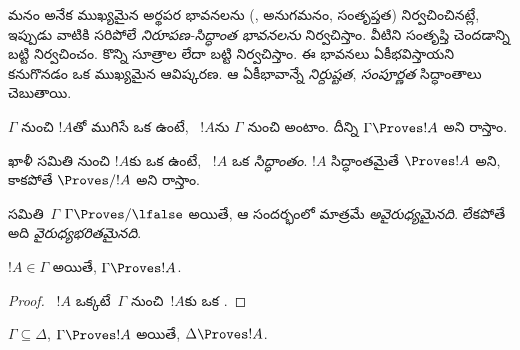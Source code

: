 \documentclass[../../../include/open-logic-section]{subfiles}
\begin{document}
      {}
      {}


\begin{explain}
మనం అనేక ముఖ్యమైన అర్థపర భావనలను
(, అనుగమనం, సంతృప్తత)
నిర్వచించినట్లే, ఇప్పుడు వాటికి సరిపోలే \emph{నిరూపణ-సిద్ధాంత
భావనలను} నిర్వచిస్తాం. వీటిని  
సంతృప్తి చెందడాన్ని బట్టి నిర్వచించం. కొన్ని సూత్రాల
 లేదా  బట్టి నిర్వచిస్తాం.
ఈ భావనలు ఏకీభవిస్తాయని కనుగొనడం ఒక ముఖ్యమైన ఆవిష్కరణ. ఆ ఏకీభావాన్నే \emph{నిర్దుష్టత}, \emph{సంపూర్ణత}
సిద్ధాంతాలు చెబుతాయి.
\end{explain}

\begin{defn}
$\Gamma$ నుంచి $!A$తో ముగిసే ఒక  ఉంటే,
~$!A$ను $\Gamma$ నుంచి \emph{} అంటాం.
దీన్ని $\Gamma \Proves !A$ అని రాస్తాం.
\end{defn}

\begin{defn}[సిద్ధాంతాలు]
ఖాళీ సమితి నుంచి $!A$కు ఒక  ఉంటే,
~$!A$ ఒక \emph{సిద్ధాంతం}. $!A$ సిద్ధాంతమైతే
$\Proves !A$ అని, కాకపోతే $\Proves/ !A$ అని రాస్తాం.
\end{defn}

\begin{defn}[అవైరుధ్యం]
 సమితి~$\Gamma$ $\Gamma\Proves/ \lfalse$ అయితే,
ఆ సందర్భంలో మాత్రమే \emph{అవైరుధ్యమైనది}. లేకపోతే అది \emph{వైరుధ్యభరితమైనది}.
\end{defn}

\begin{prop}[స్వావర్తనత్వం]
$!A \in \Gamma$ అయితే, $\Gamma \Proves !A$.
\end{prop}

\begin{proof}
  ~$!A$ ఒక్కటే~$\Gamma$ నుంచి~$!A$కు ఒక
  .
\end{proof}

\begin{prop}[ఏకదిశత]
$\Gamma \subseteq \Delta$, $\Gamma \Proves !A$ అయితే,
$\Delta \Proves !A$.
\end{prop}
\end{document}
